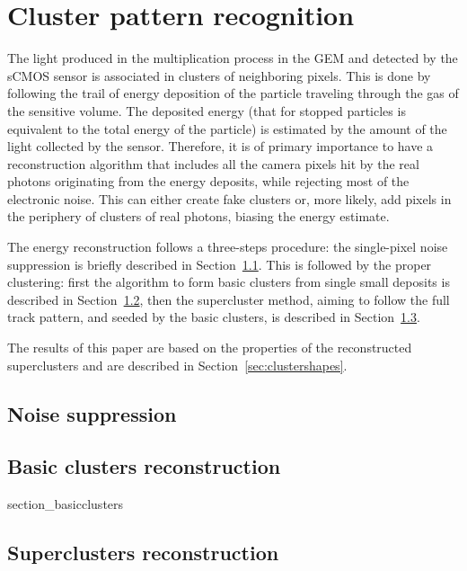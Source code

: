 \documentclass[12pt]{iopart}
\begin{document}
\section{Cluster pattern recognition}
\label{sec:clustering}
The light produced in the multiplication process in the GEM and
detected by the sCMOS sensor is associated in clusters of neighboring
pixels. This is done by following the trail of energy deposition of
the particle traveling through the gas of the sensitive volume. The
deposited energy (that for stopped particles is equivalent to the
total energy of the particle) is estimated by the amount of the light
collected by the sensor.  Therefore, it is of primary importance to
have a reconstruction algorithm that includes all the camera pixels hit by
the real photons originating from the energy deposits, while rejecting
most of the electronic noise. This can either create fake clusters or,
more likely, add pixels in the periphery of clusters of real
photons, biasing the energy estimate.

The energy reconstruction follows a three-steps procedure: the
single-pixel noise suppression is briefly described in
Section~\ref{sec:zerosuppression}. This is followed by the proper
clustering: first the algorithm to form basic clusters from single
small deposits is described in Section~\ref{sec:basiccl}, then the
supercluster method, aiming to follow the full track pattern, and
seeded by the basic clusters, is described in
Section~\ref{sec:supercl}.

The results of this paper are based on the properties of the
reconstructed superclusters and are described in
Section~\ref{sec:clustershapes}.


\subsection{Noise suppression}
\label{sec:zerosuppression}



\subsection{Basic clusters reconstruction}
\label{sec:basiccl}
 {section_basicclusters}


\subsection{Superclusters reconstruction}
\label{sec:supercl}

\end{document}
